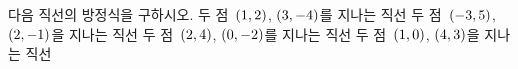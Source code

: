 다음 직선의 방정식을 구하시오.
 두 점~$(1{,}\mkern3mu\mathopen{}2)$, $(3{,}\mkern3mu\mathopen{}-4)$를 지나는 직선
 두 점~$(-3{,}\mkern3mu\mathopen{}5)$, $(2{,}\mkern3mu\mathopen{}-1)$을 지나는 직선
 두 점~$(2{,}\mkern3mu\mathopen{}4)$, $(0{,}\mkern3mu\mathopen{}-2)$를 지나는 직선
 두 점~$(1{,}\mkern3mu\mathopen{}0)$, $(4{,}\mkern3mu\mathopen{}3)$을 지나는 직선
